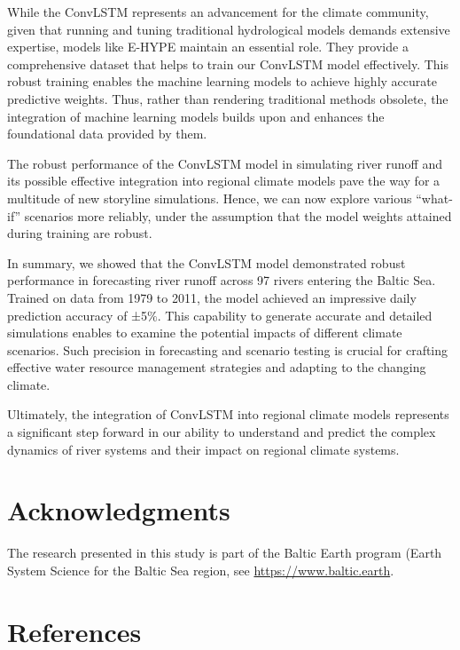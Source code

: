 \documentclass[
]{agujournal2019}
\begin{document}
While the ConvLSTM represents an advancement for the climate community,
given that running and tuning traditional hydrological models demands
extensive expertise, models like E-HYPE maintain an essential role. They
provide a comprehensive dataset that helps to train our ConvLSTM model
effectively. This robust training enables the machine learning models to
achieve highly accurate predictive weights. Thus, rather than rendering
traditional methods obsolete, the integration of machine learning models
builds upon and enhances the foundational data provided by them.

The robust performance of the ConvLSTM model in simulating river runoff
and its possible effective integration into regional climate models pave
the way for a multitude of new storyline simulations. Hence, we can now
explore various ``what-if'' scenarios more reliably, under the
assumption that the model weights attained during training are robust.

In summary, we showed that the ConvLSTM model demonstrated robust
performance in forecasting river runoff across 97 rivers entering the
Baltic Sea. Trained on data from 1979 to 2011, the model achieved an
impressive daily prediction accuracy of ±5\(\%\). This capability to
generate accurate and detailed simulations enables to examine the
potential impacts of different climate scenarios. Such precision in
forecasting and scenario testing is crucial for crafting effective water
resource management strategies and adapting to the changing climate.

Ultimately, the integration of ConvLSTM into regional climate models
represents a significant step forward in our ability to understand and
predict the complex dynamics of river systems and their impact on
regional climate systems.

\hypertarget{acknowledgments}{%
\section{Acknowledgments}\label{acknowledgments}}

The research presented in this study is part of the Baltic Earth program
(Earth System Science for the Baltic Sea region, see
\href{https://www.baltic.earth/}{https://www.baltic.earth}.

\hypertarget{references}{%
\section*{References}\label{references}}
\end{document}
